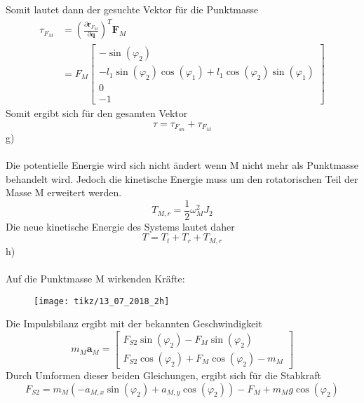 Somit lautet dann der gesuchte Vektor für die Punktmasse
\begin{align*}
	\tau_{F_M} &= \left(\frac{\partial \textbf{r}_{F_M}}{\partial \textbf{q}}\right)^T \textbf{F}_M \\
	&= F_M\begin{bmatrix}
		-\sin(\varphi_2) \\
		-l_1\sin(\varphi_2)\cos(\varphi_1) + l_1\cos(\varphi_2)\sin(\varphi_1) \\
		0 \\
		-1
	\end{bmatrix}
\end{align*}
Somit ergibt sich für den gesamten Vektor
\[
	\tau = \tau_{F_{an}} + 	\tau_{F_M}
\]
\newpage
\noindent
g)\\ \\
Die potentielle Energie wird sich nicht ändert wenn M nicht mehr als Punktmasse behandelt wird. Jedoch die kinetische Energie muss um den rotatorischen Teil der Masse M erweitert werden.
\[
	T_{M,r} = \frac{1}{2}\omega^2_MJ_2
\]
Die neue kinetische Energie des Systems lautet daher
\[
	T = T_t + T_r + T_{M,r} 
\]
h) \\ \\
Auf die Punktmasse M wirkenden Kräfte:
\begin{figure}[h]
	\centering
	\texttt{[image: tikz/13\_07\_2018\_2h]}
\end{figure}
\newline
Die Impulsbilanz ergibt mit der bekannten Geschwindigkeit
\[
	m_M\textbf{a}_M = \begin{bmatrix}
		F_{S2}\sin(\varphi_2) - F_M\sin(\varphi_2) \\
		F_{S2}\cos(\varphi_2) + F_M\cos(\varphi_2) - m_M
	\end{bmatrix}
\]
Durch Umformen dieser beiden Gleichungen, ergibt sich für die Stabkraft
\[
	F_{S2} = m_M\left(-a_{M,x}\sin(\varphi_2) + a_{M,y}\cos(\varphi_2)\right) - F_M + m_Mg\cos(\varphi_2)
\]